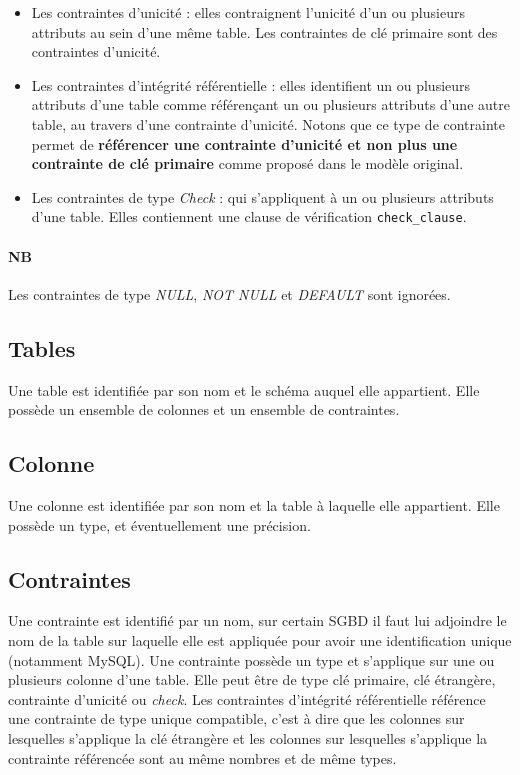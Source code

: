 \begin{itemize}
\item Les contraintes d'unicité : elles contraignent l'unicité d'un ou plusieurs attributs au sein d'une même table. Les contraintes de clé primaire sont des contraintes d'unicité.
\item Les contraintes d'intégrité référentielle : elles identifient un ou plusieurs attributs d'une table comme référençant un ou plusieurs attributs d'une autre table, au travers d'une contrainte d'unicité. Notons que ce type de contrainte permet de \textbf{référencer une contrainte d'unicité et non plus une contrainte de clé primaire} comme proposé dans le modèle original.
\item Les contraintes de type \emph{Check} : qui s'appliquent à un ou plusieurs attributs d'une table. Elles contiennent une clause de vérification \texttt{check\_clause}.
\end{itemize}

\paragraph*{NB}
Les contraintes de type \emph{NULL}, \emph{NOT NULL} et \emph{DEFAULT} sont ignorées.

	\subsection{Tables}
		Une table est identifiée par son nom et le schéma auquel elle appartient. Elle possède un ensemble de colonnes et un ensemble de contraintes.
	\subsection{Colonne}
		Une colonne est identifiée par son nom et la table à laquelle elle appartient. Elle possède un type, et éventuellement une précision. 
	\subsection{Contraintes}
		Une contrainte est identifié par un nom, sur certain SGBD il faut lui adjoindre le nom de la table sur laquelle elle est appliquée pour avoir une identification unique (notamment MySQL). Une contrainte possède un type et s'applique sur une ou plusieurs colonne d'une table. Elle peut être de type clé primaire, clé étrangère, contrainte d'unicité ou \emph{check}. Les contraintes d'intégrité référentielle référence une contrainte de type unique compatible, c'est à dire que les colonnes sur lesquelles s'applique la clé étrangère et les colonnes sur lesquelles s'applique la contrainte référencée sont au même nombres et de même types.
		
